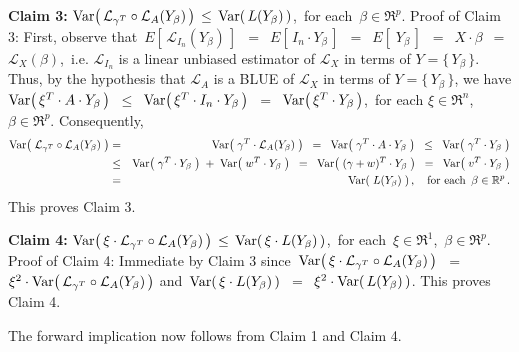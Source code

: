 \vskip 0.5cm
\noindent
\textbf{Claim 3:}\quad
$\textnormal{Var}\!\left(\,\mathcal{L}_{\gamma^{T}}\circ\mathcal{L}_{A}(Y_{\beta})\,\right)
\,\leq\,
	\textnormal{Var}\!\left(\,L(Y_{\beta})\,\right)$,\,
for each \,$\beta\in\Re^{p}$.
\vskip 0.1cm
\noindent
Proof of Claim 3:\quad
First, observe that
\,$E\!\left[\,\mathcal{L}_{I_{n}}(Y_{\beta})\,\right]$
\,$=$\, $E\!\left[\,I_{n} \cdot Y_{\beta}\,\right]$
\,$=$\, $E\!\left[\;Y_{\beta}\,\right]$
\,$=$\, $X \cdot \beta$
\,$=$\, $\mathcal{L}_{X}(\beta)$,\,
i.e. $\mathcal{L}_{I_{n}}$ is a linear unbiased estimator of $\mathcal{L}_{X}$
in terms of $Y = \{\,Y_{\beta}\,\}$.
Thus, by the hypothesis that $\mathcal{L}_{A}$ is a BLUE of $\mathcal{L}_{X}$ in terms of $Y = \{\,Y_{\beta}\,\}$,
we have
$\textnormal{Var}\!\left(\,\xi^{T} \cdot A \cdot Y_{\beta}\,\right)$
\,$\leq$\, $\textnormal{Var}\!\left(\,\xi^{T} \cdot I_{n} \cdot Y_{\beta}\,\right)$
\,$=$\, $\textnormal{Var}\!\left(\,\xi^{T} \cdot Y_{\beta}\,\right)$,\,
for each $\xi \in \Re^{n}$, $\beta\in\Re^{p}$.
Consequently,
\begin{eqnarray*}
\Var\!\left(\; \mathcal{L}_{\gamma^{T}} \circ \mathcal{L}_{A}(Y_{\beta}) \;\right)
&=&
	\Var\!\left(\; \gamma^{T} \cdot \mathcal{L}_{A}(Y_{\beta}) \;\right)
\;\; = \;\;
	\Var\!\left(\; \gamma^{T} \cdot A \cdot Y_{\beta} \;\right)
\;\; \leq \;\;
	\Var\!\left(\; \gamma^{T} \cdot Y_{\beta} \;\right)
\\
&\leq&
	\Var\!\left(\; \gamma^{T} \cdot Y_{\beta} \;\right)
	\; + \;
	\Var\!\left(\; w^{T} \cdot Y_{\beta} \;\right)
\;\;=\;\;
	\Var\!\left(\; (\gamma + w)^{T} \cdot Y_{\beta} \;\right)
\;\; = \;\;
	\Var\!\left(\; v^{T} \cdot Y_{\beta} \;\right)
\\
&=&
	\Var\!\left(\; L(Y_{\beta}) \;\right),
\quad
\textnormal{for each \,$\beta\in\Re^{p}$}\,.
\end{eqnarray*}
This proves Claim 3.

\vskip 0.5cm
\noindent
\textbf{Claim 4:}\quad
$\textnormal{Var}\!\left(\,\xi\cdot\mathcal{L}_{\gamma^{T}}\circ\mathcal{L}_{A}(Y_{\beta})\,\right)
\,\leq\,
	\textnormal{Var}\!\left(\,\xi \cdot L(Y_{\beta})\,\right)$,\,
for each \,$\xi\in\Re^{1}$, \,$\beta\in\Re^{p}$.
\vskip 0.1cm
\noindent
Proof of Claim 4:\quad
Immediate by Claim 3 since
\,$\textnormal{Var}\!\left(\,\xi\cdot\mathcal{L}_{\gamma^{T}}\circ\mathcal{L}_{A}(Y_{\beta})\,\right)$
\,$=$\, $\xi^{2}\cdot\textnormal{Var}\!\left(\,\mathcal{L}_{\gamma^{T}}\circ\mathcal{L}_{A}(Y_{\beta})\,\right)$
and
\,$\textnormal{Var}\!\left(\,\xi \cdot L(Y_{\beta})\,\right)$
\,$=$\, $\xi^{2} \cdot \textnormal{Var}\!\left(\,L(Y_{\beta})\,\right)$.
This proves Claim 4.


\vskip 0.5cm
\noindent
The forward implication now follows from Claim 1 and Claim 4.

